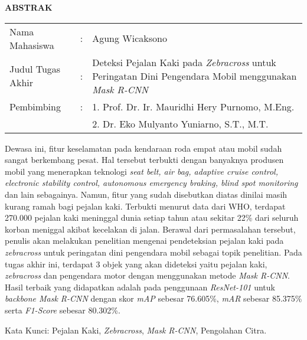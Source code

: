 \begin{center}
  \large\textbf{ABSTRAK}
\end{center}


\vspace{2ex}

\begingroup
  \setlength{\tabcolsep}{0pt}

  \noindent
  \begin{tabularx}{\textwidth}{l >{\centering}m{2em} X}
    Nama Mahasiswa    &:& Agung Wicaksono \\

    Judul Tugas Akhir &:&	Deteksi Pejalan Kaki pada \textit{Zebracross} untuk Peringatan Dini Pengendara Mobil menggunakan \textit{Mask R-CNN} \\

    Pembimbing        &:& 1. Prof. Dr. Ir. Mauridhi Hery Purnomo, M.Eng. \\
                      & & 2. Dr. Eko Mulyanto Yuniarno, S.T., M.T. \\
  \end{tabularx}
\endgroup

Dewasa ini, fitur keselamatan pada kendaraan roda empat atau mobil sudah sangat berkembang pesat. Hal tersebut terbukti dengan banyaknya produsen mobil yang menerapkan teknologi \textit{seat belt, air bag, adaptive cruise control, electronic stability control, autonomous emergency braking, blind spot monitoring} dan lain sebagainya. Namun, fitur yang sudah disebutkan diatas dinilai masih kurang ramah bagi pejalan kaki. Terbukti menurut data dari WHO, terdapat 270.000 pejalan kaki meninggal dunia setiap tahun atau sekitar 22\% dari seluruh korban meniggal akibat kecelakan di jalan. Berawal dari permasalahan tersebut, penulis akan melakukan penelitian mengenai pendeteksian pejalan kaki pada \textit{zebracross} untuk peringatan dini pengendara mobil sebagai topik penelitian. Pada tugas akhir ini, terdapat 3 objek yang akan dideteksi yaitu pejalan kaki, \textit{zebracross} dan pengendara motor dengan menggunakan metode \textit{Mask R-CNN}. Hasil terbaik yang didapatkan adalah pada penggunaan \textit{ResNet-101} untuk \textit{backbone Mask R-CNN} dengan skor \textit{mAP} sebesar 76.605\%, \textit{mAR} sebesar 85.375\% serta \textit{F1-Score} sebesar 80.302\%.

Kata Kunci: Pejalan Kaki, \emph{Zebracross}, \emph{Mask R-CNN}, Pengolahan Citra.

